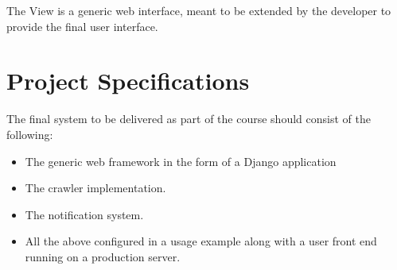 \documentclass[a4paper,10pt]{article} \usepackage{anysize}
\begin{document}
    The View is a generic web interface, meant to be extended by the developer
    to provide the final user interface.

\section{Project Specifications}
    The final system to be delivered as part of the course should consist of
    the following:
    \begin{itemize}
            \item The generic web framework in the form of a Django application
            \item The crawler implementation.
            \item The notification system.
            \item All the above configured in a usage example along with a user
                front end running on a production server.
    \end{itemize}
\end{document}
